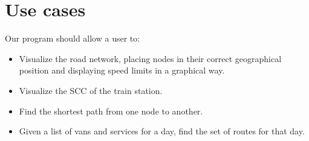 \chapter{Use cases} \label{use-cases}
Our program should allow a user to:
\begin{itemize}
    \item Visualize the road network, placing nodes in their correct geographical position and displaying speed limits in a graphical way.
    \item Visualize the SCC of the train station.
    \item Find the shortest path from one node to another.
    \item Given a list of vans and services for a day, find the set of routes for that day.
\end{itemize}
